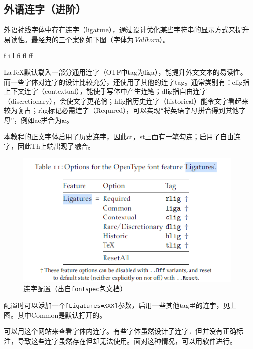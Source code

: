 \documentclass[10pt,openany]{book}
\begin{document}
\begin{sloppypar}
    

    \subsection{外语连字（进阶）}

    外语衬线字体中存在连字（ligature），通过设计优化某些字符串的显示方式来提升易读性。最经典的三个案例如下图（字体为\emph{Vollkorn}）。

    \begin{minipage}[c][3\baselineskip]{30\ccwd}
        \centering{}\Huge f i l fi fl ff
    \end{minipage}

    {\LaTeX}默认载入一部分通用连字（OTF中tag为liga），能提升外文文本的易读性。而一些字体对连字的设计比较充分，还使用了其他的连字tag。通常类别有：clig指上下文连字（contextual），能使手写体中产生连笔；dlig指自由连字（discretionary），会使文字更花俏；hlig指历史连字（historical）能令文字看起来较为复古；rlig标记必需连字（Required），可以实现“将英语字母拼合得到其他字母”，例如ae拼合为æ。

    本教程的正文字体启用了历史连字，因此ct，st上面有一笔勾连；启用了自由连字，因此Th上端出现了融合。

    \begin{figure}[H]
        \centering
        \includegraphics[width=.6\linewidth]{data/ligatures.png}
        \caption{连字配置（出自\texttt{fontspec}包文档）}
    \end{figure}

    配置时可以添加一个\texttt{{[}Ligatures=XXX{]}}参数，启用一些其他tag里的连字，见上图。其中Common是默认打开的。

    可以用这个网站来查看字体内连字。有些字体虽然设计了连字，但并没有正确标注，导致这些连字虽然存在但却无法使用。面对这种情况，可以用软件进行。


\end{sloppypar}
\end{document}
